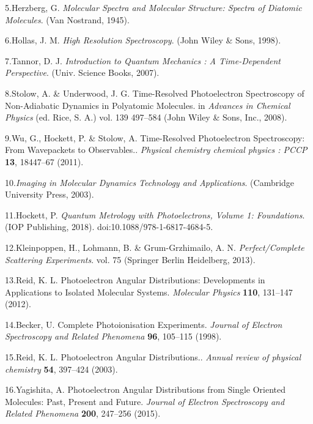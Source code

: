 \documentclass[10pt]{article}
\begin{document}
\label{csl:5}5.Herzberg, G. \textit{{Molecular {{Spectra}} and {{Molecular Structure}}: {{Spectra}} of Diatomic Molecules}}. ({Van Nostrand}, 1945).

\label{csl:6}6.Hollas, J. M. \textit{{High {{Resolution Spectroscopy}}}}. ({John Wiley \& Sons}, 1998).

\label{csl:7}7.Tannor, D. J. \textit{{Introduction to Quantum Mechanics : A Time-Dependent Perspective}}. ({Univ. Science Books}, 2007).

\label{csl:8}8.Stolow, A. \& Underwood, J. G. {Time-{{Resolved Photoelectron Spectroscopy}} of {{Non}}-{{Adiabatic Dynamics}} in {{Polyatomic Molecules}}}. in \textit{Advances in {{Chemical Physics}}} (ed. Rice, S. A.) vol. 139 497–584 ({John Wiley \& Sons, Inc.}, 2008).

\label{csl:9}9.Wu, G., Hockett, P. \& Stolow, A. {Time-Resolved Photoelectron Spectroscopy: From Wavepackets to Observables.}. \textit{Physical chemistry chemical physics : PCCP} \textbf{13}, 18447–67 (2011).

\label{csl:10}10.\textit{{Imaging in {{Molecular Dynamics Technology}} and {{Applications}}}}. ({Cambridge University Press}, 2003).

\label{csl:11}11.Hockett, P. \textit{{Quantum {{Metrology}} with {{Photoelectrons}}, {{Volume}} 1: {{Foundations}}}}. ({IOP Publishing}, 2018). doi:10.1088/978-1-6817-4684-5.

\label{csl:12}12.Kleinpoppen, H., Lohmann, B. \& {Grum-Grzhimailo}, A. N. \textit{{Perfect/{{Complete Scattering Experiments}}}}. vol. 75 ({Springer Berlin Heidelberg}, 2013).

\label{csl:13}13.Reid, K. L. {Photoelectron Angular Distributions: Developments in Applications to Isolated Molecular Systems}. \textit{Molecular Physics} \textbf{110}, 131–147 (2012).

\label{csl:14}14.Becker, U. {Complete Photoionisation Experiments}. \textit{Journal of Electron Spectroscopy and Related Phenomena} \textbf{96}, 105–115 (1998).

\label{csl:15}15.Reid, K. L. {Photoelectron Angular Distributions.}. \textit{Annual review of physical chemistry} \textbf{54}, 397–424 (2003).

\label{csl:16}16.Yagishita, A. {Photoelectron Angular Distributions from Single Oriented Molecules: {{Past}}, Present and Future}. \textit{Journal of Electron Spectroscopy and Related Phenomena} \textbf{200}, 247–256 (2015).
\end{document}
